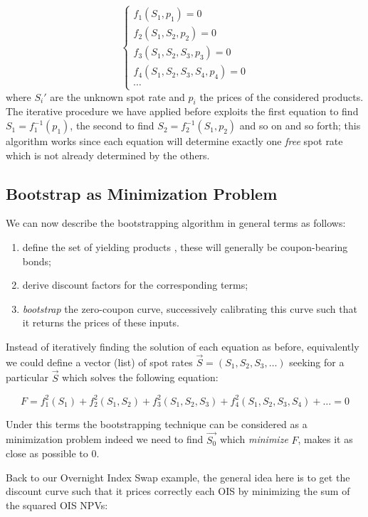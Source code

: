 \begin{equation*}
\begin{cases}
f_1(S_1, p_1) = 0 \\
f_2(S_1, S_2, p_2) = 0 \\
f_3(S_1, S_2, S_3, p_3) = 0 \\
f_4(S_1, S_2, S_3, S_4, p_4) = 0 \\
\cdots
\end{cases}
\end{equation*}
where $S_i'$ are the unknown spot rate and $p_i$ the prices of the considered products. The iterative procedure we have applied before exploits the first equation to find $S_1 = f_1^{-1}(p_1)$, the second to find $S_2 = f_2^{-1}(S_1, p_2)$ and so on and so forth; this algorithm works since each equation will determine exactly one \emph{free} spot rate which is not already determined by the others.

\subsection{Bootstrap as Minimization Problem}
We can now describe the bootstrapping algorithm in general terms as follows:
\begin{enumerate}
\item define the set of yielding products , these will generally be coupon-bearing bonds;
\item derive discount factors for the corresponding terms;
\item \emph{bootstrap} the zero-coupon curve, successively calibrating this curve such that it returns the prices of these inputs.
\end{enumerate}

Instead of iteratively finding the solution of each equation as before, equivalently we could define a vector (list) of spot rates $\vec{S} = (S_1, S_2, S_3, \ldots)$ seeking for a particular $\vec{S}$ which solves the following equation:

\begin{equation*}
F = f_1^2(S_1) + f_2^2(S_1, S_2) + f_3^2(S_1, S_2, S_3) + f_4^2(S_1, S_2, S_3, S_4) + \ldots = 0
\end{equation*}

Under this terms the bootstrapping technique can be considered as a minimization problem indeed we need to find $\vec{S_0}$ which \emph{minimize} $F$, makes it as close as possible to 0.

Back to our Overnight Index Swap example, the general idea here is to get the discount curve such that it prices correctly each OIS by minimizing the sum of the squared OIS NPVs:

